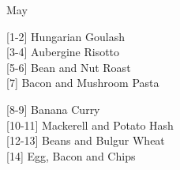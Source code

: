 		\begin{menu}{May}
    
    \begin{recipelist}
    
        {\scriptsize[1-2]} Hungarian Goulash\\
        {\scriptsize[3-4]} Aubergine Risotto\\
        {\scriptsize[5-6]} Bean and Nut Roast\\
        {\scriptsize[7]} Bacon and Mushroom Pasta\\%
    \end{recipelist}%
    \begin{recipelist}
    
        {\scriptsize[8-9]} Banana Curry\\
        {\scriptsize[10-11]} Mackerell and Potato Hash\\
        {\scriptsize[12-13]} Beans and Bulgur Wheat\\
        {\scriptsize[14]} Egg, Bacon and Chips\\%
    \end{recipelist}\par%
  

\end{menu}

